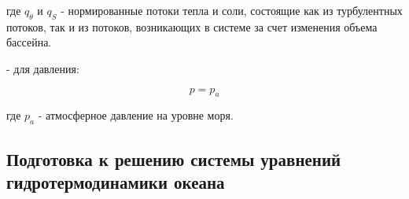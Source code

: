 	где $q_{\theta}$ и $q_S$ - нормированные потоки тепла и соли, состоящие как из турбулентных потоков, так и из потоков, возникающих в системе за счет изменения объема бассейна.
	
	\bigskip
	- для давления:
	
	\begin{equation} \label{eq:inmsom/bc4} 
	\displaystyle{ p = p_{a} } 
	\end{equation} 
	
	где $p_{a}$ - атмосферное давление на уровне моря.
	
	\subsection{Подготовка к решению системы уравнений гидротермодинамики океана}
	
